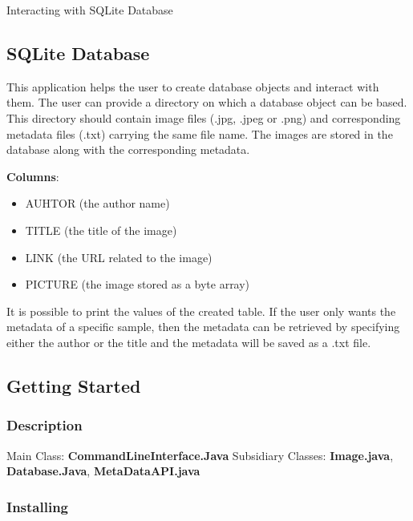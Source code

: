 Interacting with SQLite Database

\hypertarget{sqlite-database}{%
\subsection{SQLite Database}\label{sqlite-database}}

This application helps the user to create database objects and interact
with them. The user can provide a directory on which a database object
can be based. This directory should contain image files (.jpg, .jpeg or
.png) and corresponding metadata files (.txt) carrying the same file
name. The images are stored in the database along with the corresponding
metadata.

\textbf{Columns}:

\begin{itemize}
\tightlist
\item
  AUHTOR (the author name)\\
\item
  TITLE (the title of the image)\\
\item
  LINK (the URL related to the image)\\
\item
  PICTURE (the image stored as a byte array)
\end{itemize}

It is possible to print the values of the created table. If the user
only wants the metadata of a specific sample, then the metadata can be
retrieved by specifying either the author or the title and the metadata
will be saved as a .txt file.

\hypertarget{getting-started}{%
\subsection{Getting Started}\label{getting-started}}

\hypertarget{description}{%
\subsubsection{Description}\label{description}}

Main Class: \textbf{CommandLineInterface.Java} Subsidiary Classes:
\textbf{Image.java}, \textbf{Database.Java}, \textbf{MetaDataAPI.java}

\hypertarget{installing}{%
\subsubsection{Installing}\label{installing}}

